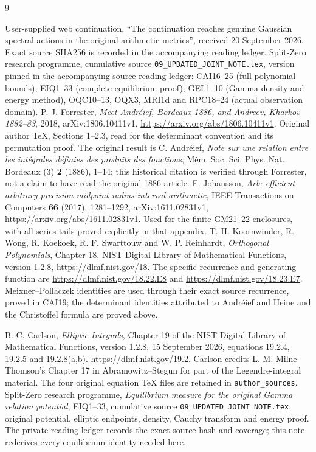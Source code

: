 \documentclass[11pt]{article}
\begin{document}
\clearpage
\begin{thebibliography}{9}

 User-supplied web continuation, ``The continuation reaches
genuine Gaussian spectral actions in the original arithmetic metrics'',
received 20 September 2026. Exact source SHA256 is recorded in the accompanying reading ledger.
 Split-Zero research programme, cumulative source
\texttt{09\_UPDATED\_JOINT\_NOTE.tex}, version pinned in the accompanying
source-reading ledger: CAI16--25 (full-polynomial bounds), EIQ1--33
(complete equilibrium proof), GEL1--10 (Gamma density and energy method),
OQC10--13, OQX3, MRI1d and RPC18--24 (actual observation domain).
 P. J. Forrester, \emph{Meet Andr\'eief, Bordeaux 1886,
and Andreev, Kharkov 1882--83}, 2018, arXiv:1806.10411v1,
\url{https://arxiv.org/abs/1806.10411v1}. Original author TeX, Sections
1--2.3, read for the determinant convention and its permutation proof.
The original result is C. Andr\'eief, \emph{Note sur une relation entre
les int\'egrales d\'efinies des produits des fonctions},
M\'em. Soc. Sci. Phys. Nat. Bordeaux (3) \textbf{2} (1886), 1--14;
this historical citation is verified through Forrester, not a claim
to have read the original 1886 article.
 F. Johansson, \emph{Arb: efficient arbitrary-precision
midpoint-radius interval arithmetic}, IEEE Transactions on Computers
\textbf{66} (2017), 1281--1292, arXiv:1611.02831v1,
\url{https://arxiv.org/abs/1611.02831v1}. Used for the finite GM21--22
enclosures, with all series tails proved explicitly in that appendix.
 T. H. Koornwinder, R. Wong, R. Koekoek,
R. F. Swarttouw and W. P. Reinhardt, \emph{Orthogonal Polynomials},
Chapter 18, NIST Digital Library of Mathematical Functions, version 1.2.8,
\url{https://dlmf.nist.gov/18}. The specific recurrence and generating
function are \url{https://dlmf.nist.gov/18.22.E8} and
\url{https://dlmf.nist.gov/18.23.E7}.
Meixner--Pollaczek identities are used through their exact source
recurrence, proved in CAI19; the determinant identities attributed to
Andr\'eief and Heine and the Christoffel formula are proved above.


 B. C. Carlson, \emph{Elliptic Integrals}, Chapter 19 of
the NIST Digital Library of Mathematical Functions, version 1.2.8,
15 September 2026, equations 19.2.4, 19.2.5 and 19.2.8(a,b).
\url{https://dlmf.nist.gov/19.2}. Carlson credits L. M. Milne-Thomson's
Chapter 17 in Abramowitz--Stegun for part of the Legendre-integral material.
The four original equation TeX files are retained in \texttt{author\_sources}.
 Split-Zero research programme, \emph{Equilibrium measure for
the original Gamma relation potential}, EIQ1--33, cumulative source
\texttt{09\_UPDATED\_JOINT\_NOTE.tex}, original potential, elliptic endpoints,
density, Cauchy transform and energy proof. The private reading ledger
records the exact source hash and coverage; this note rederives every
equilibrium identity needed here.

\end{thebibliography}
\end{document}
